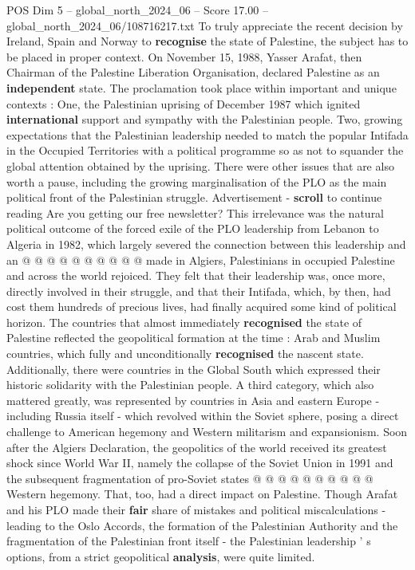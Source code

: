 \begin{textsample}{POS Dim 5 – global\_north\_2024\_06 – Score 17.00 – global\_north\_2024\_06/108716217.txt}  \label{ex:f5_pos_315}
To truly appreciate the recent decision by Ireland, Spain and Norway to \textbf{recognise} the state of Palestine, the subject has to be placed in proper context.
On November 15, 1988, Yasser Arafat, then Chairman of the Palestine Liberation Organisation, declared Palestine as an \textbf{independent} state.
The proclamation took place within important and unique contexts : One, the Palestinian uprising of December 1987 which ignited \textbf{international} support and sympathy with the Palestinian people.
Two, growing expectations that the Palestinian leadership needed to match the popular Intifada in the Occupied Territories with a political programme so as not to squander the global attention obtained by the uprising.
There were other issues that are also worth a pause, including the growing marginalisation of the PLO as the main political front of the Palestinian struggle.
Advertisement - \textbf{scroll} to continue reading Are you getting our free newsletter?
This irrelevance was the natural political outcome of the forced exile of the PLO leadership from Lebanon to Algeria in 1982, which largely severed the connection between this leadership and an @ @ @ @ @ @ @ @ @ @ made in Algiers, Palestinians in occupied Palestine and across the world rejoiced.
They felt that their leadership was, once more, directly involved in their struggle, and that their Intifada, which, by then, had cost them hundreds of precious lives, had finally acquired some kind of political horizon.
The countries that almost immediately \textbf{recognised} the state of Palestine reflected the geopolitical formation at the time : Arab and Muslim countries, which fully and unconditionally \textbf{recognised} the nascent state.
Additionally, there were countries in the Global South which expressed their historic solidarity with the Palestinian people.
A third category, which also mattered greatly, was represented by countries in Asia and eastern Europe - including Russia itself - which revolved within the Soviet sphere, posing a direct challenge to American hegemony and Western militarism and expansionism.
Soon after the Algiers Declaration, the geopolitics of the world received its greatest shock since World War II, namely the collapse of the Soviet Union in 1991 and the subsequent fragmentation of pro-Soviet states @ @ @ @ @ @ @ @ @ @ Western hegemony.
That, too, had a direct impact on Palestine.
Though Arafat and his PLO made their \textbf{fair} share of mistakes and political miscalculations - leading to the Oslo Accords, the formation of the Palestinian Authority and the fragmentation of the Palestinian front itself - the Palestinian leadership ' s options, from a strict geopolitical \textbf{analysis}, were quite limited.

\end{textsample}
